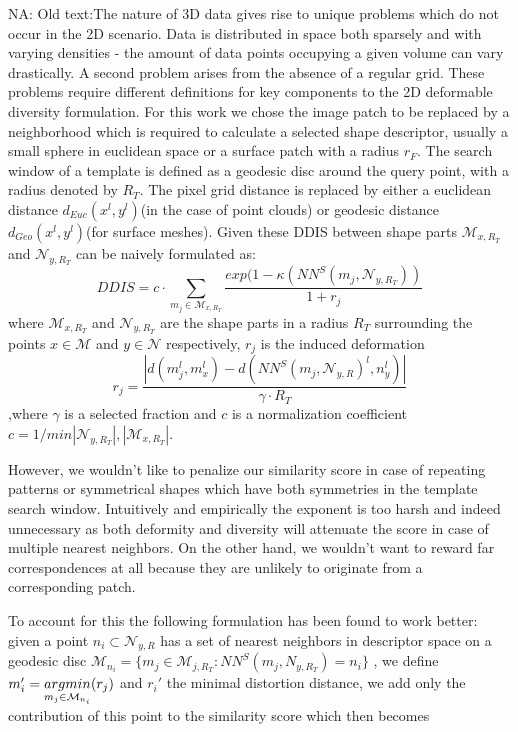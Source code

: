 \documentclass[10pt,twocolumn,letterpaper]{article}
\newcommand{\colornote}[3]{{\color{#1}\bf{#2: #3}\normalfont}}
\newcommand{\colornote}[3]{}
\newcommand {\nadav}[1]{\colornote{red}{NA}{#1}}
\begin{document}
\nadav{Old text:The nature of 3D data gives rise to unique problems which do not occur in the 2D scenario. Data is distributed in space both sparsely and with varying densities - the amount of data points occupying a given volume can vary drastically.
A second problem arises from the absence of a regular grid. These problems require different definitions for key components to the 2D deformable diversity formulation. For this work we chose the image patch to be replaced by a neighborhood which is required to calculate a selected shape descriptor, usually a small sphere in euclidean space or a surface patch with a radius $r_F$. 
The search window of a template is defined as a geodesic disc around the query point, with a radius denoted by $R_T$. The pixel grid distance is replaced by either a euclidean distance $d_{Euc}(x^l,y^l)$(in the case of point clouds) or geodesic distance $d_{Geo}(x^l,y^l)$(for surface meshes).
Given these DDIS  between shape parts $\mathcal{M}_{x,R_T}$ and $\mathcal{N}_{y,R_T}$ can be naively formulated as:
\begin{equation}
DDIS=c\cdot\sum_{m_j\in\mathcal{M}_{x,R_T}}\frac{exp(1-\kappa(NN^S(m_j,\mathcal{N}_{y,R_T}))}{1+r_j}
\end{equation}
where $\mathcal{M}_{x,R_T}$ and $\mathcal{N}_{y,R_T}$ are the shape parts in a radius $R_T$ surrounding the points $x\in \mathcal{M}$ and $y \in \mathcal{N}$ respectively, $r_j$ is the induced deformation
\begin{equation} 
r_j=\frac{|d(m_j^l,m_x^l)-d(NN^S(m_j,\mathcal{N}_{y,R})^l,n_y^l)|}{\gamma\cdot R_T}
\end{equation}
,where $\gamma$ is a selected fraction and $c$ is a normalization coefficient $c=1/min{|\mathcal{N}_{y,R_T}|,|\mathcal{M}_{x,R_T}|}$.

However, we wouldn't like to penalize our similarity score in case of repeating patterns or symmetrical shapes which have both symmetries in the template search window. Intuitively and empirically the exponent is too harsh and indeed unnecessary as both deformity and diversity will attenuate the score in case of multiple nearest neighbors. On the other hand, we wouldn't want to reward far correspondences at all because they are unlikely to originate from a corresponding patch. 



To account for this the following formulation has been found to work better: given a point $n_i\subset \mathcal{N}_{y,R}$ has a set of nearest neighbors in descriptor space on a geodesic disc 
$\mathcal{M}_{n_i}=\{m_j\in\mathcal{M}_{j,R_T}:NN^S(m_j,N_{y,R_T})=n_i\}$ 
, we define 
$m_i' = \underset{m_j\in\mathcal{M}_{n_i}}{argmin}\space (r_j)$
and $r_i'$ the minimal distortion distance, we add only the contribution of this point to the similarity score which then becomes}
\end{document}
